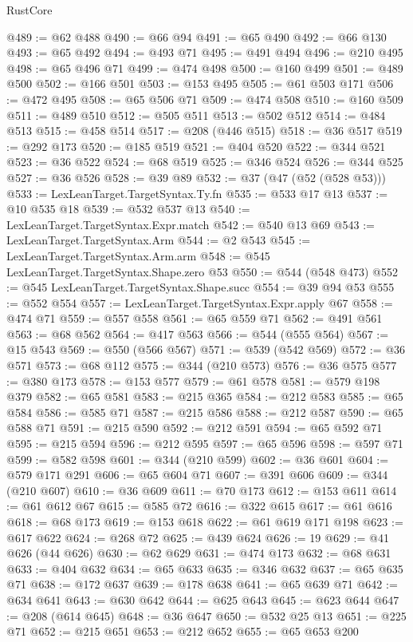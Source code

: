 \begin{lexlean}{RustCore}
\begin{coremodule}
@489 := @62 @488
@490 := @66 @94
@491 := @65 @490
@492 := @66 @130
@493 := @65 @492
@494 := @493 @71
@495 := @491 @494
@496 := @210 @495
@498 := @65 @496 @71
@499 := @474 @498
@500 := @160 @499
@501 := @489 @500
@502 := @166 @501
@503 := @153 @495
@505 := @61 @503 @171
@506 := @472 @495
@508 := @65 @506 @71
@509 := @474 @508
@510 := @160 @509
@511 := @489 @510
@512 := @505 @511
@513 := @502 @512
@514 := @484 @513
@515 := @458 @514
@517 := @208 (@446 @515)
@518 := @36 @517
@519 := @292 @173
@520 := @185 @519
@521 := @404 @520
@522 := @344 @521
@523 := @36 @522
@524 := @68 @519
@525 := @346 @524
@526 := @344 @525
@527 := @36 @526
@528 := @39 @89
@532 := @37 (@47 (@52 (@528 @53)))
@533 := LexLeanTarget.TargetSyntax.Ty.fn
@535 := @533 @17 @13
@537 := @10 @535 @18
@539 := @532 @537 @13
@540 := LexLeanTarget.TargetSyntax.Expr.match
@542 := @540 @13 @69
@543 := LexLeanTarget.TargetSyntax.Arm
@544 := @2 @543
@545 := LexLeanTarget.TargetSyntax.Arm.arm
@548 := @545 LexLeanTarget.TargetSyntax.Shape.zero @53
@550 := @544 (@548 @473)
@552 := @545 LexLeanTarget.TargetSyntax.Shape.succ
@554 := @39 @94 @53
@555 := @552 @554
@557 := LexLeanTarget.TargetSyntax.Expr.apply @67
@558 := @474 @71
@559 := @557 @558
@561 := @65 @559 @71
@562 := @491 @561
@563 := @68 @562
@564 := @417 @563
@566 := @544 (@555 @564)
@567 := @15 @543
@569 := @550 (@566 @567)
@571 := @539 (@542 @569)
@572 := @36 @571
@573 := @68 @112
@575 := @344 (@210 @573)
@576 := @36 @575
@577 := @380 @173
@578 := @153 @577
@579 := @61 @578
@581 := @579 @198 @379
@582 := @65 @581
@583 := @215 @365
@584 := @212 @583
@585 := @65 @584
@586 := @585 @71
@587 := @215 @586
@588 := @212 @587
@590 := @65 @588 @71
@591 := @215 @590
@592 := @212 @591
@594 := @65 @592 @71
@595 := @215 @594
@596 := @212 @595
@597 := @65 @596
@598 := @597 @71
@599 := @582 @598
@601 := @344 (@210 @599)
@602 := @36 @601
@604 := @579 @171 @291
@606 := @65 @604 @71
@607 := @391 @606
@609 := @344 (@210 @607)
@610 := @36 @609
@611 := @70 @173
@612 := @153 @611
@614 := @61 @612 @67
@615 := @585 @72
@616 := @322 @615
@617 := @61 @616
@618 := @68 @173
@619 := @153 @618
@622 := @61 @619 @171 @198
@623 := @617 @622
@624 := @268 @72
@625 := @439 @624
@626 := 19
@629 := @41 @626 (@44 @626)
@630 := @62 @629
@631 := @474 @173
@632 := @68 @631
@633 := @404 @632
@634 := @65 @633
@635 := @346 @632
@637 := @65 @635 @71
@638 := @172 @637
@639 := @178 @638
@641 := @65 @639 @71
@642 := @634 @641
@643 := @630 @642
@644 := @625 @643
@645 := @623 @644
@647 := @208 (@614 @645)
@648 := @36 @647
@650 := @532 @25 @13
@651 := @225 @71
@652 := @215 @651
@653 := @212 @652
@655 := @65 @653 @200

\end{coremodule}
\end{lexlean}
